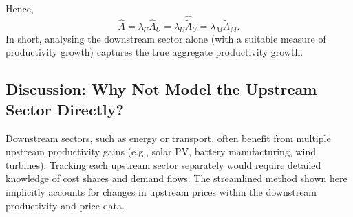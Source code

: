 \documentclass[11pt]{article}
\begin{document}
Hence,
\begin{equation}
      \hat{A}  =  \lambda_U \hat{A}_U  =  \lambda_U \hat{\tilde{A}}_U 
     =  \lambda_M \hat{\tilde{A}}_M.
\end{equation}
In short, analysing the downstream sector alone (with a suitable measure of productivity growth) captures the true aggregate productivity growth.



\subsection{Discussion: Why Not Model the Upstream Sector Directly?}
Downstream sectors, such as energy or transport, often benefit from multiple upstream productivity gains (e.g., solar PV, battery manufacturing, wind turbines). Tracking each upstream sector separately would require detailed knowledge of cost shares and demand flows. The streamlined method shown here implicitly accounts for changes in upstream prices within the downstream productivity and price data. 
\end{document}
